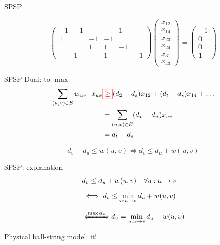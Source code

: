 \begin{frame}{SPSP}

  \begin{equation*}
	\begin{pmatrix}
	  -1	&	-1	&	&	&	1	&	\\
	  1		&		&	-1	&	-1	&	\\
	  		&		&	1	&	1	&	-1	\\
	 		&	1	&	&	1	&	&	-1
	\end{pmatrix}
	\begin{pmatrix}
	  x_{12}\\x_{14}\\x_{23}\\x_{24}\\x_{31}\\x_{43}
	\end{pmatrix}
	= 
	\begin{pmatrix}
	  -1\\0\\0\\1
	\end{pmatrix}
  \end{equation*}
\end{frame}
\begin{frame}{SPSP}
  Dual: to $\max$
  \begin{align*}
	\sum_{(u,v) \in E} w_{uv} \cdot x_{uv} & \textcolor{red}{\boxed{\geq}} (d_2 - d_s) x_{12} + (d_t - d_s) x_{14} + \dots	\\
	&	=	\sum_{(u,v) \in E} (d_v - d_u) x_{uv}	\\
	&	=	d_t - d_s
  \end{align*}

  \[
	d_v - d_u \leq w(u,v) \iff d_v \leq d_u + w(u,v)
  \]
\end{frame}
\begin{frame}{SPSP: explanation}
  \begin{align*}
	&	d_v \leq d_u + w(u,v)	\quad \forall u: u \to v	\\[6pt]
	& 	\iff	d_v \leq \min_{u: u \to v} d_u + w(u,v)	\\[6pt]
	&	\xLeftrightarrow{\max d_v}	d_v = \min_{u: u \to v} d_u + w(u,v)
  \end{align*}

  \vspace{0.50cm}

  \begin{center}
	Physical ball-string model:  it!
  \end{center}
\end{frame}
